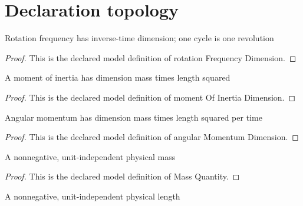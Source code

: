 \section{Declaration topology}
\begin{definition}
  \label{def:physics:phyx-mini-0711:phyxminiproblems-problemphyxmini0711-rotationfrequencydimension}
  Rotation frequency has inverse-time dimension; one cycle is one revolution
\end{definition}
\begin{proof}
  This is the declared model definition of rotation Frequency Dimension.
\end{proof}
\begin{definition}
  \label{def:physics:phyx-mini-0711:phyxminiproblems-problemphyxmini0711-momentofinertiadimension}
  A moment of inertia has dimension mass times length squared
\end{definition}
\begin{proof}
  This is the declared model definition of moment Of Inertia Dimension.
\end{proof}
\begin{definition}
  \label{def:physics:phyx-mini-0711:phyxminiproblems-problemphyxmini0711-angularmomentumdimension}
  Angular momentum has dimension mass times length squared per time
\end{definition}
\begin{proof}
  This is the declared model definition of angular Momentum Dimension.
\end{proof}
\begin{definition}
  \label{def:physics:phyx-mini-0711:phyxminiproblems-problemphyxmini0711-massquantity}
  A nonnegative, unit-independent physical mass
\end{definition}
\begin{proof}
  This is the declared model definition of Mass Quantity.
\end{proof}
\begin{definition}
  \label{def:physics:phyx-mini-0711:phyxminiproblems-problemphyxmini0711-lengthquantity}
  A nonnegative, unit-independent physical length
\end{definition}
